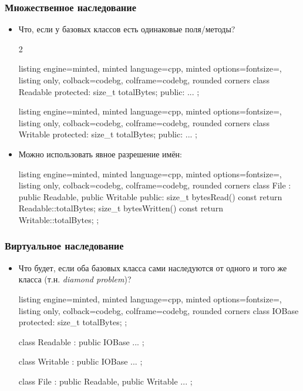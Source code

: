 \documentclass[10pt]{beamer}
\begin{document}
\begin{frame}[fragile]
\frametitle{Множественное наследование}
\begin{itemize}
\item Что, если у базовых классов есть одинаковые поля/методы?
\begin{multicols}{2}
\begin{tcblisting}{listing engine=minted, minted language=cpp, minted options={fontsize=\scriptsize}, listing only, colback=codebg, colframe=codebg, rounded corners}
class Readable {
protected:
  size_t totalBytes;
public:
  ...
};
\end{tcblisting}
\begin{tcblisting}{listing engine=minted, minted language=cpp, minted options={fontsize=\scriptsize}, listing only, colback=codebg, colframe=codebg, rounded corners}
class Writable {
protected:
  size_t totalBytes;
public:
  ...
};
\end{tcblisting}
\end{multicols}
\pause
{}
\item Можно использовать явное разрешение имён:
\begin{tcblisting}{listing engine=minted, minted language=cpp, minted options={fontsize=\scriptsize}, listing only, colback=codebg, colframe=codebg, rounded corners}
class File : public Readable, public Writable {
public:
  size_t bytesRead() const { return Readable::totalBytes; }
  size_t bytesWritten() const { return Writable::totalBytes; }
};
\end{tcblisting}
\end{itemize}
\end{frame}

\begin{frame}[fragile]
\frametitle{Виртуальное наследование}
\begin{itemize}
\item Что будет, если оба базовых класса сами наследуются от одного и того же класса (т.н. \textit{diamond problem})?
\begin{tcblisting}{listing engine=minted, minted language=cpp, minted options={fontsize=\scriptsize}, listing only, colback=codebg, colframe=codebg, rounded corners}
class IOBase {
protected:
  size_t totalBytes;
};

class Readable : public IOBase {
  ...
};

class Writable : public IOBase {
  ...
};

class File : public Readable, public Writable {
  ...
};
\end{tcblisting}
\end{itemize}
\end{frame}
\end{document}
